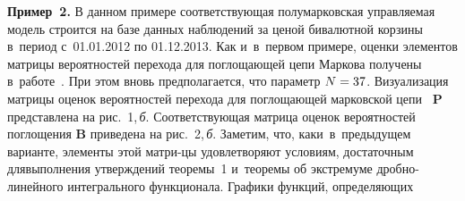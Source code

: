 \begin{multicols}{2}
\noindent
\textbf{Пример~2.} В данном примере соответствующая полумарковская управляемая 
модель строится на базе данных наблюдений за ценой бивалютной корзины в~период с~01.01.2012 по 01.12.2013. Как и~в~первом примере, оценки элементов мат\-ри\-цы 
вероятностей перехода для поглощающей цепи Маркова получены в~работе~\cite{A6}. 
При этом вновь предполагается, что параметр $N\hm=37$. Визуализация матрицы оценок 
вероятностей перехода для по\-гло\-ща\-ющей марковской цепи~ $\textbf{P}$ пред\-став\-ле\-на 
на рис.~1,\,\textit{б}. Со\-от\-вет\-ст\-ву\-ющая мат\-ри\-ца оценок вероятностей по\-гло\-ще\-ния $\textbf{B}$ 
приведена на рис.~2,\,\textit{б}. Заметим, что, как\linebreak и~в~предыду\-щем варианте, элементы этой 
матри-\linebreak цы удовле\-тво\-ря\-ют условиям, достаточным для\linebreak выполнения утверж\-де\-ний тео\-ре\-мы~1 
и~теоремы об экстремуме дроб\-но-ли\-ней\-но\-го интегрального функционала. Графики 
функций, опре\-де\-ля\-ющих\linebreak\vspace*{-11.5pt}

\pagebreak

\end{multicols}

\begin{figure*} %
\vspace*{1pt}
  \begin{center}
 \mbox{%
 \epsfxsize=162.901mm 
 }
\end{center}
\vspace*{-9pt}
\vspace*{11pt}
  \begin{center}
 \mbox{%
 \epsfxsize=157.34mm 
 }
\end{center}
\vspace*{-9pt}
\vspace*{3pt}
\end{figure*}


